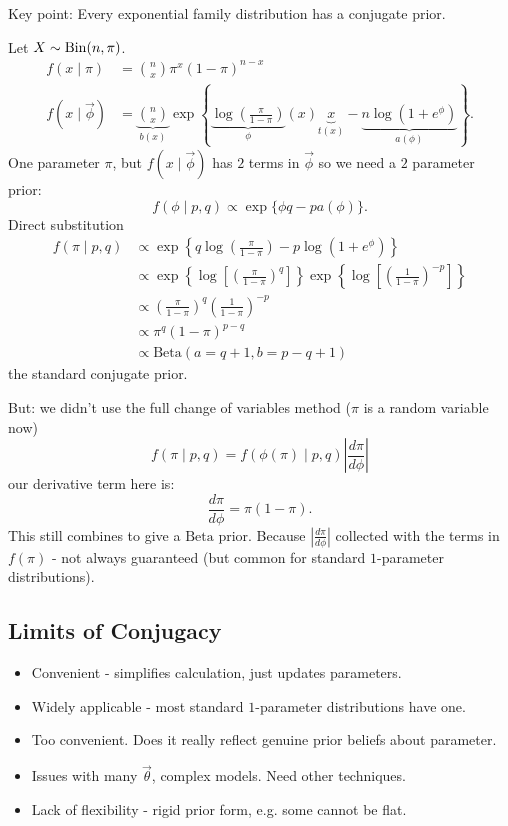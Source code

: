 \documentclass[10pt, a4paper]{article}
\begin{document}
Key point:
Every exponential family distribution has a conjugate prior.

\begin{example}
    Let $X \sim \operatorname{Bin}(n, \pi)$.
    \begin{align*}
        f(x \mid \pi) &= \binom{n}{x}\pi ^ x(1 - \pi) ^ {n - x} \\
        f(x \mid \vec{\phi}) &= \underbrace{\binom{n}{x}}_{b(x)}\exp\left\{\underbrace{\log\left(\frac{\pi}{1 - \pi}\right)}_\phi(x)\underbrace{x}_{t(x)} - \underbrace{n\log(1 + e ^ {\phi})}_{a(\phi)}\right\}.
    \end{align*}
    One parameter $\pi$,
    but $f(x \mid \vec{\phi})$ has $2$ terms in $\vec{\phi}$ so we need a $2$ parameter prior:
    \[
    f(\phi \mid p, q) \propto \exp\{\phi q - pa(\phi)\}.
    \]
    Direct substitution
    \begin{align*}
        f(\pi \mid p, q) &\propto \exp\left\{q\log\left(\frac{\pi}{1 - \pi}\right) - p\log(1 + e ^ {\phi})\right\} \\
        &\propto \exp\left\{\log\left[\left(\frac{\pi}{1 - \pi}\right) ^ q\right]\right\}\exp\left\{\log\left[\left(\frac{1}{1 - \pi}\right) ^ {-p}\right]\right\} \\
        &\propto \left(\frac{\pi}{1 - \pi}\right) ^ q\left(\frac{1}{1 - \pi}\right) ^ {-p} \\
        &\propto \pi ^ q(1 - \pi) ^ {p - q} \\
        &\propto \mathrm{Beta}(a = q + 1, b = p - q + 1)
    \end{align*}
    the standard conjugate prior.
\end{example}

But:
we didn't use the full change of variables method
($\pi$ is a random variable now)
\[
f(\pi \mid p, q) = f(\phi(\pi) \mid p, q)\left|\frac{d\pi}{d\phi}\right|
\]
our derivative term here is:
\[
\frac{d\pi}{d\phi} = \pi(1 - \pi).
\]
This still combines to give a $\mathrm{Beta}$ prior.
Because $\left|\frac{d\pi}{d\phi}\right|$ collected with the terms in $f(\pi)$ -
not always guaranteed
(but common for standard $1$-parameter distributions).

\subsection{Limits of Conjugacy}
\begin{itemize}
    \item Convenient -
    simplifies calculation,
    just updates parameters.

    \item Widely applicable -
    most standard $1$-parameter distributions have one.

    \item Too convenient.
    Does it really reflect genuine prior beliefs about parameter.

    \item Issues with many $\vec{\theta}$,
    complex models.
    Need other techniques.

    \item Lack of flexibility -
    rigid prior form,
    e.g. some cannot be flat.
\end{itemize}
\end{document}
